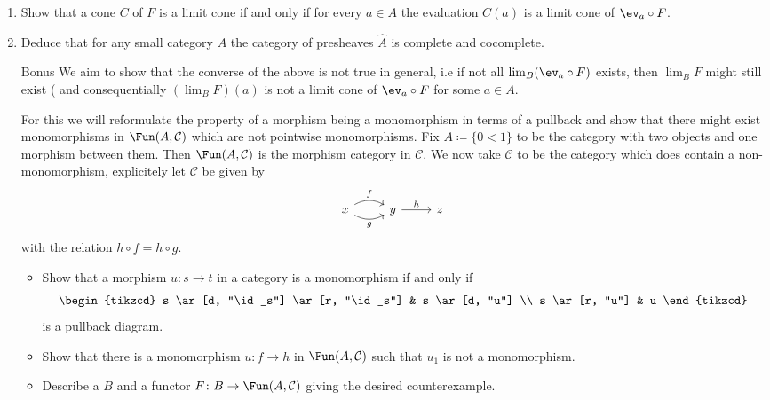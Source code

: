 \begin{enumerate}[label=(\alph*)]
    \item 
    Show that a cone $ C $ of $ F $ is a limit cone if and only if for every $ a \in A $
    the evaluation $  C ( a ) $ is a limit cone of $ \ev_a \circ F $.

    \item 
    Deduce that for any small category $ A $ the category of presheaves $ \widehat{ A } $ is complete and cocomplete.

    \item 
    [Bonus] 
    We aim to show that the converse of the above is not true in general, i.e if not all
    $ \lim_B ( \ev_a \circ F ) $ exists, then $ \lim_B F $ might still exist ( and consequentially $( \lim_B F ) ( a ) $ is not a limit cone of $ \ev_a \circ F $ for some $ a \in A $.

    For this we will reformulate the property of a morphism being a monomorphism in terms of a pullback and show that there might exist monomorphisms in $ \Fun ( A , \mathcal{ C } )$ which are not pointwise monomorphisms. Fix $ A  \coloneqq \{ 0 < 1 \} $ to be the category with two objects and one morphism between them.
    Then $ \Fun ( A , \mathcal{ C } ) $ is the morphism category in $ \mathcal{ C } $.
    We now take $ \mathcal{ C } $ to be the category which does contain a non-monomorphism, explicitely let $ \mathcal{ C }$ be given by
    \[
    \begin{tikzcd}
        x 
        \ar[r, bend left, "f"]
        \ar[r, bend right, "g"']
        &
        y
        \ar[r, "h"]
        &
        z
    \end{tikzcd}
    \]
    with the relation $ h \circ f = h \circ g$.
    \begin{itemize}
        \item 
        Show that a morphism $ u \colon s \to t $ in a category is a monomorphism if and only if 
        \[
        \begin{tikzcd}
            s 
            \ar[d, "\id_s"]
            \ar[r, "\id_s"]
            &
            s
            \ar[d, "u"]
            \\
            s 
            \ar[r, "u"]
            & 
            u
        \end{tikzcd}
        \]
        is a pullback diagram.

        \item 
        Show that there is a monomorphism $ u \colon f \to h $ in $\Fun ( A , \mathcal{C} )$ such that $ u_1 $ is not a monomorphism.

        \item 
        Describe a $ B $ and a functor $ F  \colon B \to \Fun ( A , \mathcal{C} ) $ giving the desired counterexample.
        
    \end{itemize}
\end{enumerate}

